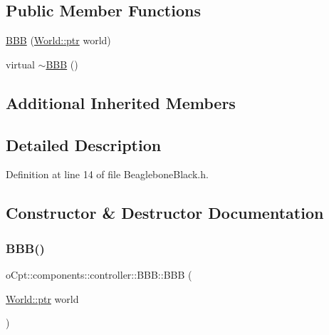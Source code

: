 \subsection*{Public Member Functions}
\begin{DoxyCompactItemize}
\item 
\hyperlink{classo_cpt_1_1components_1_1controller_1_1_b_b_b_a7f5b95ebd0b1b176ee6ecbb3ac61e06c}{B\+BB} (\hyperlink{classo_cpt_1_1_world_aa6e591e3096d5de71e0cec9039663d67}{World\+::ptr} world)
\item 
virtual \hyperlink{classo_cpt_1_1components_1_1controller_1_1_b_b_b_acdf417541bfd66c55fba8a09e8cd09a1}{$\sim$\+B\+BB} ()
\end{DoxyCompactItemize}
\subsection*{Additional Inherited Members}


\subsection{Detailed Description}


Definition at line 14 of file Beaglebone\+Black.\+h.



\subsection{Constructor \& Destructor Documentation}
\hypertarget{classo_cpt_1_1components_1_1controller_1_1_b_b_b_a7f5b95ebd0b1b176ee6ecbb3ac61e06c}{}\label{classo_cpt_1_1components_1_1controller_1_1_b_b_b_a7f5b95ebd0b1b176ee6ecbb3ac61e06c} 
\subsubsection{\texorpdfstring{B\+B\+B()}{BBB()}}
{\footnotesize\ttfamily o\+Cpt\+::components\+::controller\+::\+B\+B\+B\+::\+B\+BB (\begin{DoxyParamCaption}\item[{\hyperlink{classo_cpt_1_1_world_aa6e591e3096d5de71e0cec9039663d67}{World\+::ptr}}]{world }\end{DoxyParamCaption})}



